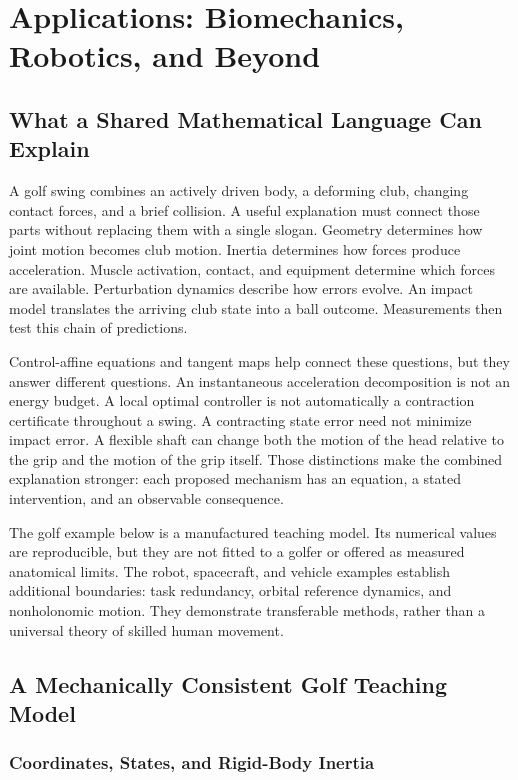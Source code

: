 \chapter{Applications: Biomechanics, Robotics, and Beyond}
\label{ch:applications}


\section{What a Shared Mathematical Language Can Explain}

A golf swing combines an actively driven body, a deforming club, changing contact forces, and a brief collision. A useful explanation must connect those parts without replacing them with a single slogan. Geometry determines how joint motion becomes club motion. Inertia determines how forces produce acceleration. Muscle activation, contact, and equipment determine which forces are available. Perturbation dynamics describe how errors evolve. An impact model translates the arriving club state into a ball outcome. Measurements then test this chain of predictions.

Control-affine equations and tangent maps help connect these questions, but they answer different questions. An instantaneous acceleration decomposition is not an energy budget. A local optimal controller is not automatically a contraction certificate throughout a swing. A contracting state error need not minimize impact error. A flexible shaft can change both the motion of the head relative to the grip and the motion of the grip itself. Those distinctions make the combined explanation stronger: each proposed mechanism has an equation, a stated intervention, and an observable consequence.

The golf example below is a manufactured teaching model. Its numerical values are reproducible, but they are not fitted to a golfer or offered as measured anatomical limits. The robot, spacecraft, and vehicle examples establish additional boundaries: task redundancy, orbital reference dynamics, and nonholonomic motion. They demonstrate transferable methods, rather than a universal theory of skilled human movement.

\section{A Mechanically Consistent Golf Teaching Model}

\subsection{Coordinates, States, and Rigid-Body Inertia}

